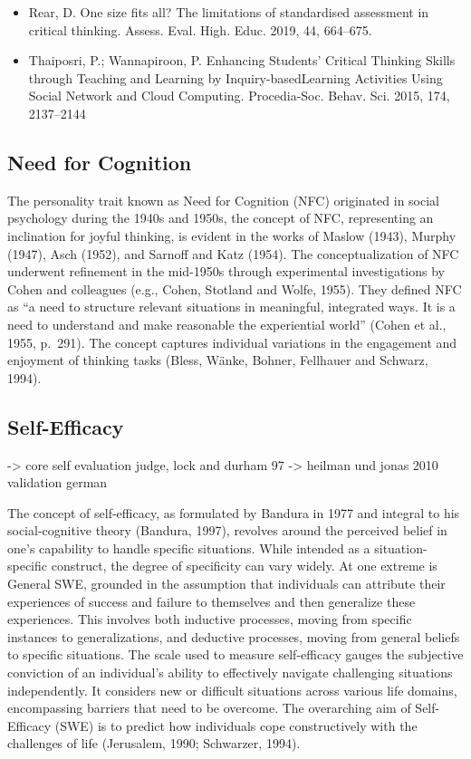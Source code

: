 \documentclass[
  12pt,
  a4paper,
  twoside]{article}
\begin{document}
\begin{itemize}
\item
  Rear, D. One size fits all? The limitations of standardised assessment in critical thinking. Assess. Eval. High. Educ. 2019, 44, 664--675.
\item
  Thaiposri, P.; Wannapiroon, P. Enhancing Students' Critical Thinking Skills through Teaching and Learning by Inquiry-basedLearning Activities Using Social Network and Cloud Computing. Procedia-Soc. Behav. Sci. 2015, 174, 2137--2144
\end{itemize}

\hypertarget{need-for-cognition}{%
\subsection{Need for Cognition}\label{need-for-cognition}}

The personality trait known as Need for Cognition (NFC) originated in social psychology during the 1940s and 1950s, the concept of NFC, representing an inclination for joyful thinking, is evident in the works of Maslow (1943), Murphy (1947), Asch (1952), and Sarnoff and Katz (1954). The conceptualization of NFC underwent refinement in the mid-1950s through experimental investigations by Cohen and colleagues (e.g., Cohen, Stotland and Wolfe, 1955). They defined NFC as ``a need to structure relevant situations in meaningful, integrated ways. It is a need to understand and make reasonable the experiential world'' (Cohen et al., 1955, p.~291). The concept captures individual variations in the engagement and enjoyment of thinking tasks (Bless, Wänke, Bohner, Fellhauer and Schwarz, 1994).

\hypertarget{self-efficacy}{%
\subsection{Self-Efficacy}\label{self-efficacy}}

-\textgreater{} core self evaluation judge, lock and durham 97
-\textgreater{} heilman und jonas 2010 validation german

The concept of self-efficacy, as formulated by Bandura in 1977 and integral to his social-cognitive theory (Bandura, 1997), revolves around the perceived belief in one's capability to handle specific situations. While intended as a situation-specific construct, the degree of specificity can vary widely. At one extreme is General SWE, grounded in the assumption that individuals can attribute their experiences of success and failure to themselves and then generalize these experiences. This involves both inductive processes, moving from specific instances to generalizations, and deductive processes, moving from general beliefs to specific situations.
The scale used to measure self-efficacy gauges the subjective conviction of an individual's ability to effectively navigate challenging situations independently. It considers new or difficult situations across various life domains, encompassing barriers that need to be overcome. The overarching aim of Self-Efficacy (SWE) is to predict how individuals cope constructively with the challenges of life (Jerusalem, 1990; Schwarzer, 1994).
\end{document}
